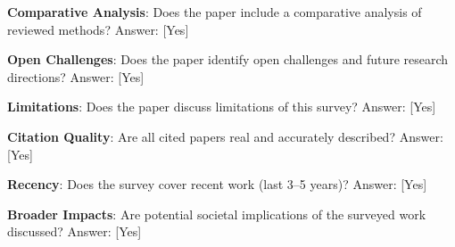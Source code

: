 \documentclass{article}
\begin{document}
\textbf{Comparative Analysis}: Does the paper include a comparative analysis of reviewed methods?
Answer: [Yes]

\textbf{Open Challenges}: Does the paper identify open challenges and future research directions?
Answer: [Yes]

\textbf{Limitations}: Does the paper discuss limitations of this survey?
Answer: [Yes]

\textbf{Citation Quality}: Are all cited papers real and accurately described?
Answer: [Yes]

\textbf{Recency}: Does the survey cover recent work (last 3--5 years)?
Answer: [Yes]

\textbf{Broader Impacts}: Are potential societal implications of the surveyed work discussed?
Answer: [Yes]



\end{document}
